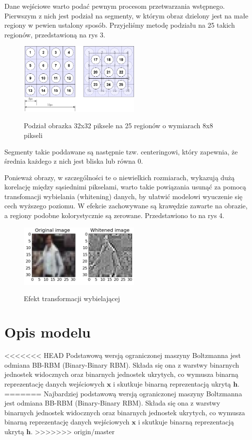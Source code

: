 \documentclass[a4paper,10pt]{report}
\begin{document}
Dane wejściowe warto podać pewnym procesom przetwarzania wstępnego. Pierwszym z nich jest podział na segmenty, w którym obraz dzielony jest na małe regiony w pewien ustalony sposób. Przyjeliśmy metodę podziału na 25 takich regionów, przedstawioną na rys 3.

\begin{figure}
 \centering
 \includegraphics[width=6cm]{imgs/segmentacja.png}
 \label{fig:segmentacja}
 \caption{Podział obrazka 32x32 piksele na 25 regionów o wymiarach 8x8 pikseli \cite{cifar}}
\end{figure}

Segmenty takie poddawane są następnie tzw. centeringowi, który zapewnia, że średnia każdego z nich jest bliska lub równa 0.

Ponieważ obrazy, w szczególności te o niewielkich rozmiarach, wykazują dużą korelację między sąsiednimi pikselami, warto takie powiązania usunąć za pomocą transfomacji wybielania (whitening) danych, by ułatwić modelowi wyuczenie się cech wyższego poziomu. W efekcie zachowywane są krawędzie zawarte na obrazie, a regiony podobne kolorystycznie są zerowane. Przedstawiono to na rys 4.

\begin{figure}
 \centering
 \includegraphics[width=6cm]{imgs/whitening.png}
 \label{fig:whitening}
 \caption{Efekt transformacji wybielającej \cite{melchior2012}}
\end{figure}

\section{Opis modelu}

<<<<<<< HEAD
Podstawową wersją ograniczonej maszyny Boltzmanna jest odmiana BB-RBM (Binary-Binary RBM). Składa się ona z warstwy binarnych jednostek widocznych oraz binarnych jednostek ukrytych, co wymusza binarną reprezentację danych wejściowych $\mathbf{x}$ i skutkuje binarną reprezentacją ukrytą $\mathbf{h}$.
=======
Najbardziej podstawową wersją ograniczonej maszyny Boltzmanna jest odmiana BB-RBM (Binary-Binary RBM).
Składa się ona z warstwy binarnych jednostek widocznych oraz binarnych jednostek ukrytych, co wymusza
binarną reprezentację danych wejściowych $\mathbf{x}$ i skutkuje binarną reprezentacją ukrytą
$\mathbf{h}$.
>>>>>>> origin/master
\end{document}
